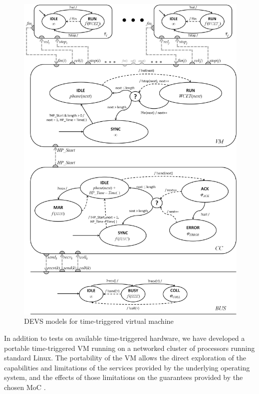 \begin{figure} [h]
	\includegraphics[width=0.9\columnwidth]{DEVS_system}
	\caption{DEVS models for time-triggered virtual machine}
	\label{fig:devs_sys}
\end{figure}

In addition to tests on available time-triggered hardware, we have 
developed a portable time-triggered VM running on a networked cluster
of processors running standard Linux.  The portability of the VM allows the direct 
exploration of the capabilities and limitations of the 
services provided by the underlying operating system, and the effects of those 
limitations on the guarantees provided by the chosen MoC \cite{TK_TMR}.

